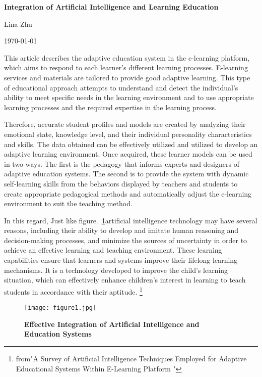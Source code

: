 \documentclass[a4paper,12pt,twocolumn]{article}
\begin{document}
\begin{center}
	
	\textbf{\bfseries \LARGE Integration of Artificial Intelligence and Learning Education} 
\end{center}
\begin{center}
	Lina Zhu
\end{center}
\begin{center}
	\today
\end{center}

	\par 	This article describes the adaptive education system in the e-learning platform, which aims to respond to each learner's different learning processes. E-learning services and materials are tailored to provide good adaptive learning. This type of educational approach attempts to understand and detect the individual’s ability to meet specific needs in the learning environment and to use appropriate learning processes and the required expertise in the learning process.
	\par Therefore, accurate student profiles and models are created by analyzing their emotional state, knowledge level, and their individual personality characteristics and skills. The data obtained can be effectively utilized and utilized to develop an adaptive learning environment. Once acquired, these learner models can be used in two ways. The first is the pedagogy that informs experts and designers of adaptive education systems. The second is to provide the system with dynamic self-learning skills from the behaviors displayed by teachers and students to create appropriate pedagogical methods and automatically adjust the e-learning environment to suit the teaching method.
	\par In this regard, Just like figure.~\ref{pic1}artificial intelligence technology may have several reasons, including their ability to develop and imitate human reasoning and decision-making processes, and minimize the sources of uncertainty in order to achieve an effective learning and teaching environment. These learning capabilities ensure that learners and systems improve their lifelong learning mechanisms. It is a technology developed to improve the child's learning situation, which can effectively enhance children's interest in learning to teach students in accordance with their aptitude.
	\footnote{from"A Survey of Artificial Intelligence Techniques Employed for   Adaptive Educational  Systems Within E-Learning Platform	"} 

\begin{figure}[htp]
	\centering
	\texttt{[image: figure1.jpg]}
	\caption{\bfseries{  Effective Integration of Artificial Intelligence and Education Systems}}\label{pic1}
\end{figure}
\end{document}
